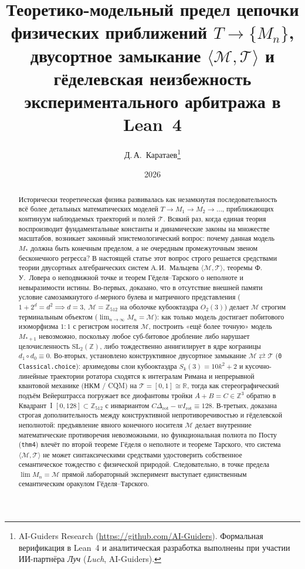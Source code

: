 \documentclass[11pt,a4paper]{article}
\title{\textbf{Теоретико-модельный предел цепочки физических приближений $T \to \{M_n\}$, двусортное замыкание $\langle\mathcal{M},\mathcal{T}\rangle$ и гёделевская неизбежность экспериментального арбитража в Lean~4}}
\author{Д.\,А.~Каратаев\thanks{AI-Guiders Research (\url{https://github.com/AI-Guiders}). Формальная верификация в Lean~4 и аналитическая разработка выполнены при участии ИИ-партнёра \emph{Луч} (\emph{Luch}, AI-Guiders).}}
\date{2026}
\theoremstyle{definition}
\theoremstyle{remark}
\begin{document}
\maketitle

\begin{abstract}
Исторически теоретическая физика развивалась как незамкнутая последовательность всё более детальных математических моделей $T \to M_1 \to M_2 \to \dots$, приближающих континуум наблюдаемых траекторий и полей $\mathcal{T}$. Всякий раз, когда единая теория воспроизводит фундаментальные константы и динамические законы на множестве масштабов, возникает законный эпистемологический вопрос: почему данная модель $M_*$ должна быть конечным пределом, а не очередным промежуточным звеном бесконечного регресса? В настоящей статье этот вопрос строго решается средствами теории двусортных алгебраических систем А.\,И.~Мальцева $\langle\mathcal{M},\mathcal{T}\rangle$, теоремы Ф.\,У.~Ловера о неподвижной точке и теорем Гёделя--Тарского о неполноте и невыразимости истины. Во-первых, доказано, что в отсутствие внешней памяти условие самозамкнутого $d$-мерного булева и матричного представления ($1 + 2^d = d^2 \implies d = 3,\ \mathcal{M} = \mathbb{Z}_{512}$ на оболочке кубооктаэдра $O_2(3)$) делает $\mathcal{M}$ строгим терминальным объектом ($\lim_{n\to\infty} M_n = \mathcal{M}$): как только модель достигает побитового изоморфизма $1:1$ с регистром носителя $\mathcal{M}$, построить «ещё более точную» модель $M_{*+1}$ невозможно, поскольку любое суб-битовое дробление либо нарушает целочисленность $\mathrm{SL}_2(\mathbb{Z})$, либо тождественно аннигилирует в ядре кограницы $d_1\circ d_0 \equiv 0$. Во-вторых, установлено конструктивное двусортное замыкание $\mathcal{M} \rightleftarrows \mathcal{T}$ (\texttt{0 Classical.choice}): архимедовы слои кубооктаэдра $S_k(3) = 10k^2 + 2$ и кусочно-линейные траектории ротатора сходятся к интегралам Римана и непрерывной квантовой механике (НКМ / CQM) на $\mathcal{T} = [0,1]\cong\mathbb{R}$, тогда как стереографический подъём Вейерштрасса погружает все диофантовы тройки $A+B=C\in\mathbb{Z}^3$ обратно в Квадрант~I $[0,128]\subset\mathbb{Z}_{512}$ с инвариантом $C\Delta_{\mathrm{rot}} - w I_{\mathrm{rot}} \equiv 128$. В-третьих, доказана строгая дополнительность между конструктивной непротиворечивостью и гёделевской неполнотой: предъявление явного конечного носителя $\mathcal{M}$ делает внутренние математические противоречия невозможными, но функциональная полнота по Посту (\texttt{thm4}) влечёт по второй теореме Гёделя о неполноте и теореме Тарского, что система $\langle\mathcal{M},\mathcal{T}\rangle$ не может синтаксическими средствами удостоверить собственное семантическое тождество с физической природой. Следовательно, в точке предела $\lim M_n = \mathcal{M}$ прямой лабораторный эксперимент выступает единственным семантическим оракулом Гёделя--Тарского.
\end{abstract}
\end{document}
